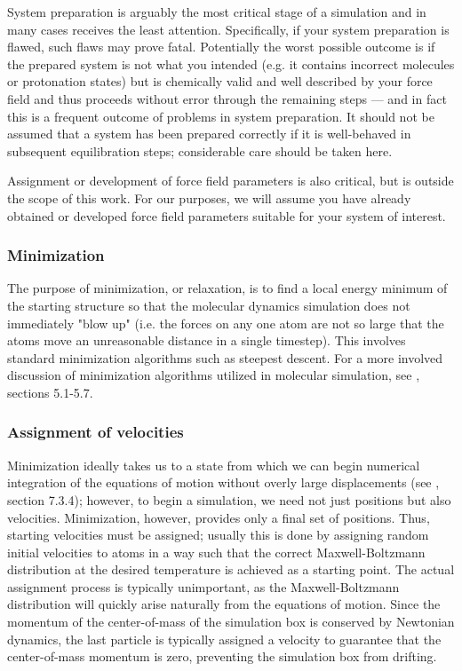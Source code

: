 \documentclass[9pt,bestpractices]{livecoms}
\begin{document}
System preparation is arguably the most critical stage of a simulation and in many cases receives the least attention.
Specifically, if your system preparation is flawed, such flaws may prove fatal.
Potentially the worst possible outcome is if the prepared system is not what you intended (e.g. it contains incorrect molecules or protonation states) but is chemically valid and well described by your force field and thus proceeds without error through the remaining steps --- and in fact this is a  frequent outcome of problems in system preparation.
It should not be assumed that a system has been prepared correctly if it is well-behaved in subsequent equilibration steps; considerable care should be taken here.

Assignment or development of force field parameters is also critical, but is outside the scope of this work.
For our purposes, we will assume you have already obtained or developed force field parameters suitable for your system of interest.

\subsubsection{Minimization}

The purpose of minimization, or relaxation, is to find a local energy minimum of the starting structure so that the molecular dynamics simulation does not immediately "blow up" (i.e. the forces on any one atom are not so large that the atoms move an unreasonable distance in a single timestep).
This involves standard minimization algorithms such as steepest descent.
For a more involved discussion of minimization algorithms utilized in molecular simulation, see \citet{LeachBook}, sections 5.1-5.7.

\subsubsection{Assignment of velocities}
\label{sec:velocities}
Minimization ideally takes us to a state from which we can begin numerical integration of the equations of motion without overly large displacements (see \citet{LeachBook}, section 7.3.4); however, to begin a simulation, we need not just positions but also velocities.
Minimization, however, provides only a final set of positions.
Thus, starting velocities must be assigned; usually this is done by assigning random initial velocities to atoms in a way such that the correct Maxwell-Boltzmann distribution at the desired temperature is achieved as a starting point.
The actual assignment process is typically unimportant, as the Maxwell-Boltzmann distribution will quickly arise naturally from the equations of motion.
Since the momentum of the center-of-mass of the simulation box is conserved by Newtonian dynamics, the last particle is typically assigned a velocity to guarantee that the center-of-mass momentum is zero, preventing the simulation box from drifting.
\end{document}

